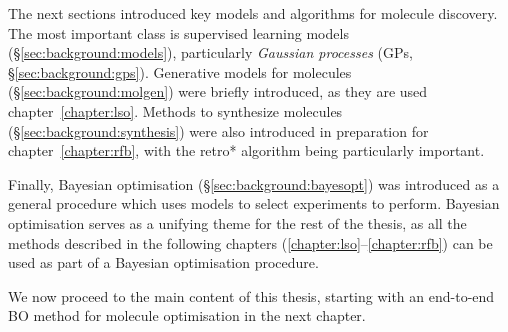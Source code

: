 The next sections introduced key models and algorithms for molecule discovery.
The most important class is supervised learning models (\S\ref{sec:background:models}),
particularly \emph{Gaussian processes} (GPs, \S\ref{sec:background:gps}).
Generative models for molecules (\S\ref{sec:background:molgen}) were briefly introduced,
as they are used chapter~\ref{chapter:lso}.
Methods to synthesize molecules (\S\ref{sec:background:synthesis}) were also introduced
in preparation for chapter~\ref{chapter:rfb},
with the retro* algorithm being particularly important.

Finally, Bayesian optimisation (\S\ref{sec:background:bayesopt}) was introduced as a general procedure
which uses models to select experiments to perform.
Bayesian optimisation serves as a unifying theme for the rest of the thesis,
as all the methods described in the following chapters (\ref{chapter:lso}--\ref{chapter:rfb})
can be used as part of a Bayesian optimisation procedure.

We now proceed to the main content of this thesis,
starting with an end-to-end BO method for molecule optimisation
in the next chapter.

